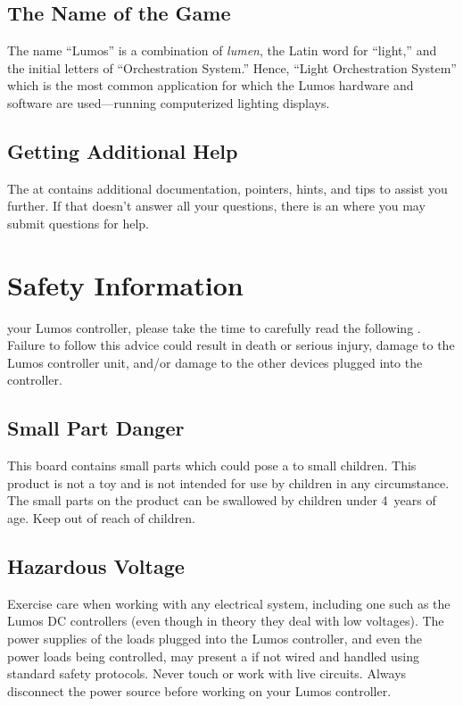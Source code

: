 \documentclass[letterpaper,twoside,onecolumn,openright,final]{memoir}
\begin{document}
\section{The Name of the Game}
The name ``Lumos'' is a combination of \emph{lumen}, the Latin word for ``light,''
and the initial letters of ``Orchestration System.''  Hence, ``Light Orchestration System''
which is the most common application for which the Lumos hardware and software are used---running
computerized lighting displays.

\section{Getting Additional Help}
The  at  contains additional documentation,
pointers, hints, and tips to assist you further.  If that doesn't answer all your questions,
there is an  where you may submit questions for help.


\chapter{Safety Information}\label{ch:safety}

 your Lumos controller, please take the time to
carefully read the following .  Failure to follow this advice could
result in death or serious injury, damage to the Lumos controller unit, and/or damage
to the other devices plugged into the controller.

\section{Small Part Danger}
This board contains small parts which could pose a  to small children.
This product is not a toy and is not intended for use by children in any circumstance.
The small parts on the product can be swallowed by children under 4~years of age. Keep
out of reach of children.

\section{Hazardous Voltage}
Exercise care when working with any electrical system, including one such as the Lumos DC
controllers (even though in theory they deal with low voltages).  The power supplies of the
loads plugged into the Lumos controller, and even the power loads being controlled, may present
a  if not wired and handled using standard safety protocols.  Never touch or work
with live circuits. Always disconnect the power source before working on your Lumos controller.
\end{document}
